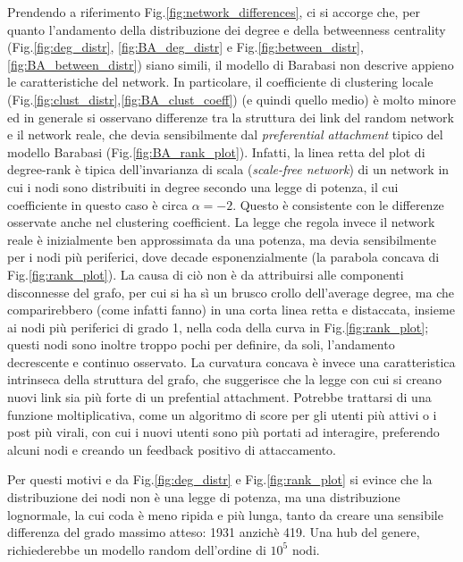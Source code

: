 \documentclass[twocolumn]{article}
\begin{document}
   Prendendo a riferimento Fig.\ref{fig:network_differences}, ci si accorge che, per quanto l'andamento della distribuzione dei degree
   e della betweenness centrality (Fig.\ref{fig:deg_distr}, \ref{fig:BA_deg_distr} e Fig.\ref{fig:between_distr}, \ref{fig:BA_between_distr}) siano simili,
   il modello di Barabasi non descrive appieno le caratteristiche del network.
   In particolare, il coefficiente di clustering locale (Fig.\ref{fig:clust_distr},\ref{fig:BA_clust_coeff}) (e quindi quello medio) è
   molto minore ed in generale si osservano differenze tra la struttura dei link del random network e il network reale, che devia
   sensibilmente dal \textit{preferential attachment} tipico del modello Barabasi (Fig.\ref{fig:BA_rank_plot}).
   Infatti, la linea retta del plot di degree-rank è tipica dell'invarianza di scala (\textit{scale-free network}) di un network in cui
   i nodi sono distribuiti in degree secondo una legge di potenza, il cui coefficiente in questo caso è circa $\alpha=-2$.
   Questo è consistente con le differenze osservate anche nel clustering coefficient.
   La legge che regola invece il network reale è inizialmente ben approssimata da una potenza, ma devia sensibilmente per i nodi
   più periferici, dove decade esponenzialmente (la parabola concava di Fig.\ref{fig:rank_plot}).
   La causa di ciò non è da attribuirsi alle componenti disconnesse del grafo, per cui si ha sì un brusco crollo dell'average degree,
   ma che comparirebbero (come infatti fanno) in una corta linea retta e distaccata, insieme ai nodi più periferici di grado 1, nella coda
   della curva in Fig.\ref{fig:rank_plot}; questi nodi sono inoltre troppo pochi per definire, da soli, l'andamento decrescente e continuo osservato.
   La curvatura concava è invece una caratteristica intrinseca della struttura del grafo, che suggerisce che la legge con cui si creano
   nuovi link sia più forte di un prefential attachment.
   Potrebbe trattarsi di una funzione moltiplicativa, come un algoritmo di score per gli utenti più attivi o i post più virali, con cui i nuovi 
   utenti sono più portati ad interagire, preferendo alcuni nodi e creando un feedback positivo di attaccamento.

   Per questi motivi e da Fig.\ref{fig:deg_distr} e Fig.\ref{fig:rank_plot} si evince che la distribuzione dei nodi non è una legge di potenza, ma una distribuzione lognormale,
   la cui coda è meno ripida e più lunga, tanto da creare una sensibile differenza del grado massimo atteso: 1931 anzichè 419.
   Una hub del genere, richiederebbe un modello random dell'ordine di $10^5$ nodi.
\end{document}
